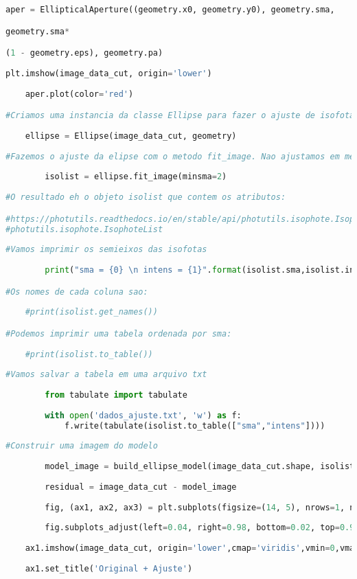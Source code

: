 \documentclass[a4paper, 11pt, fleqn, leqno]{article}
\begin{document}
{\begin{lstlisting}[language=Python]
aper = EllipticalAperture((geometry.x0, geometry.y0), geometry.sma, 

geometry.sma*

(1 - geometry.eps), geometry.pa)
    
plt.imshow(image_data_cut, origin='lower')
    
    aper.plot(color='red')

#Criamos uma instancia da classe Ellipse para fazer o ajuste de isofotas elipticas
    
	ellipse = Ellipse(image_data_cut, geometry)
    
#Fazemos o ajuste da elipse com o metodo fit_image. Nao ajustamos em menos de 2 pixels.
    
    	isolist = ellipse.fit_image(minsma=2)
    
#O resultado eh o objeto isolist que contem os atributos:

#https://photutils.readthedocs.io/en/stable/api/photutils.isophote.IsophoteList.html
#photutils.isophote.IsophoteList
    
#Vamos imprimir os semieixos das isofotas
    
    	print("sma = {0} \n intens = {1}".format(isolist.sma,isolist.intens))

#Os nomes de cada coluna sao:
    
    #print(isolist.get_names())

#Podemos imprimir uma tabela ordenada por sma:
    
    #print(isolist.to_table())
    
#Vamos salvar a tabela em uma arquivo txt
    
    	from tabulate import tabulate
    
    	with open('dados_ajuste.txt', 'w') as f:
    		f.write(tabulate(isolist.to_table(["sma","intens"])))
    
#Construir uma imagem do modelo
    
    	model_image = build_ellipse_model(image_data_cut.shape, isolist)
    
    	residual = image_data_cut - model_image
    
    	fig, (ax1, ax2, ax3) = plt.subplots(figsize=(14, 5), nrows=1, ncols=3)
    
    	fig.subplots_adjust(left=0.04, right=0.98, bottom=0.02, top=0.98)
    
    ax1.imshow(image_data_cut, origin='lower',cmap='viridis',vmin=0,vmax=2)
    
    ax1.set_title('Original + Ajuste')
    

\end{lstlisting}}
\end{document}
